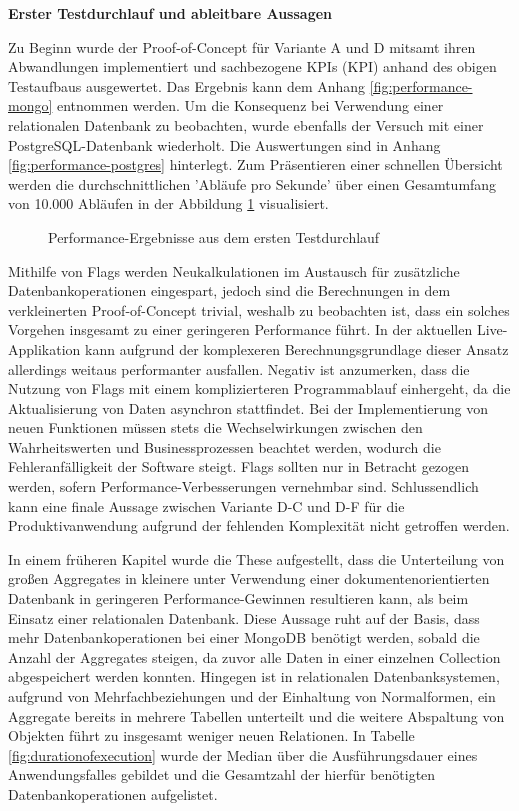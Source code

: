 \textbf{Erster Testdurchlauf und ableitbare Aussagen}

Zu Beginn wurde der Proof-of-Concept für Variante A und D mitsamt ihren Abwandlungen implementiert und sachbezogene \acrshort{KPI}s (\acrlong{KPI}) anhand des obigen Testaufbaus ausgewertet. Das Ergebnis kann dem Anhang \ref{fig:performance-mongo} entnommen werden. Um die Konsequenz bei Verwendung einer relationalen Datenbank zu beobachten, wurde ebenfalls der Versuch mit einer PostgreSQL-Datenbank wiederholt. Die Auswertungen sind in Anhang \ref{fig:performance-postgres} hinterlegt. Zum Präsentieren einer schnellen Übersicht werden die durchschnittlichen 'Abläufe pro Sekunde' über einen Gesamtumfang von 10.000 Abläufen in der Abbildung \ref{fig:PerformanceDefault} visualisiert.

\begin{figure}[htpb]
	\centering
	\footnotesize
	
	\caption{Performance-Ergebnisse aus dem ersten Testdurchlauf}
	\label{fig:PerformanceDefault}
\end{figure}

Mithilfe von Flags werden Neukalkulationen im Austausch für zusätzliche Datenbankoperationen eingespart, jedoch sind die Berechnungen in dem verkleinerten Proof-of-Concept trivial, weshalb zu beobachten ist, dass ein solches Vorgehen insgesamt zu einer geringeren Performance führt. In der aktuellen Live-Applikation kann aufgrund der komplexeren Berechnungsgrundlage dieser Ansatz allerdings weitaus performanter ausfallen. Negativ ist anzumerken, dass die Nutzung von Flags mit einem komplizierteren Programmablauf einhergeht, da die Aktualisierung von Daten asynchron stattfindet. Bei der Implementierung von neuen Funktionen müssen stets die Wechselwirkungen zwischen den Wahrheitswerten und Businessprozessen beachtet werden, wodurch die Fehleranfälligkeit der Software steigt. Flags sollten nur in Betracht gezogen werden, sofern Performance-Verbesserungen vernehmbar sind. Schlussendlich kann eine finale Aussage zwischen Variante D-C und D-F für die Produktivanwendung aufgrund der fehlenden Komplexität nicht getroffen werden.

In einem früheren Kapitel wurde die These aufgestellt, dass die Unterteilung von großen Aggregates in kleinere unter Verwendung einer dokumentenorientierten Datenbank in geringeren Performance-Gewinnen resultieren kann, als beim Einsatz einer relationalen Datenbank. Diese Aussage ruht auf der Basis, dass mehr Datenbankoperationen bei einer MongoDB benötigt werden, sobald die Anzahl der Aggregates steigen, da zuvor alle Daten in einer einzelnen Collection abgespeichert werden konnten. Hingegen ist in relationalen Datenbanksystemen, aufgrund von Mehrfachbeziehungen und der Einhaltung von Normalformen, ein Aggregate bereits in mehrere Tabellen unterteilt und die weitere Abspaltung von Objekten führt zu insgesamt weniger neuen Relationen. In Tabelle \ref{fig:durationofexecution} wurde der Median über die Ausführungsdauer eines Anwendungsfalles gebildet und die Gesamtzahl der hierfür benötigten Datenbankoperationen aufgelistet. 

